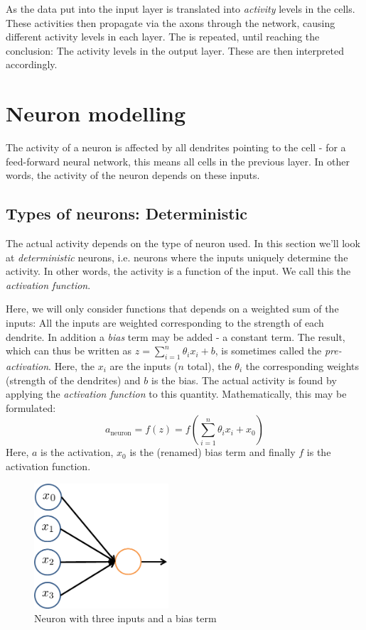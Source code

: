 \documentclass[12pt, a4paper]{article}
\numberwithin{equation}{section}
\begin{document}
As the data put into the input layer is translated into \textit{activity} levels in the cells. These activities then propagate via the axons through the network, causing different activity levels in each layer. The is repeated, until reaching the conclusion: The activity levels in the output layer. These are then interpreted accordingly.

\section{Neuron modelling}

The activity of a neuron is affected by all dendrites pointing to the cell - for a feed-forward neural network, this means all cells in the previous layer. In other words, the activity of the neuron depends on these inputs.

\subsection{Types of neurons: Deterministic}
The actual activity depends on the type of neuron used. In this section we'll look at \textit{deterministic} neurons, i.e. neurons where the inputs uniquely determine the activity. In other words, the activity is a function of the input. We call this the \textit{activation function}.

Here, we will only consider functions that depends on a weighted sum of the inputs: All the inputs are weighted corresponding to the strength of each dendrite. In addition a \textit{bias} term may be added - a constant term. The result, which can thus be written as $z=\sum_{i=1}^n \theta_i x_i + b$, is sometimes called the \textit{pre-activation}. Here, the $x_i$ are the inputs ($n$ total), the $\theta_i$ the corresponding weights (strength of the dendrites) and $b$ is the bias. The actual activity is found by applying the \textit{activation function} to this quantity. Mathematically, this may be formulated:
\begin{equation}
\label{neuron_activity}
a_\textrm{neuron}=f(z)=f\left(\sum_{i=1}^n \theta_i x_i + x_0\right)
\end{equation}
Here, $a$ is the activation, $x_0$ is the (renamed) bias term and finally $f$ is the activation function.

\begin{figure}
\centering
\includegraphics[width=50mm]{neuron}
\caption{Neuron with three inputs and a bias term}
\label{fig:neuron}
\end{figure}
\end{document}
